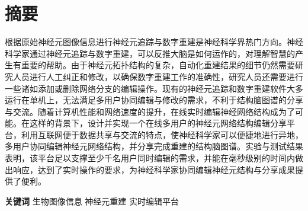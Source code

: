 \chapter{摘要}

根据原始神经元图像信息进行神经元追踪与数字重建是神经科学界热门方向。神经科学家通过神经元追踪与数字重建，可以反推大脑是如何运作的，对理解智慧的产生有重要的帮助。由于神经元拓扑结构的复杂，自动化重建结果的细节仍然需要研究人员进行人工纠正和修改，以确保数字重建工作的准确性，研究人员还需要进行一些诸如添加或删除网络分支的编辑操作。现有的神经元追踪和数字重建软件大多运行在单机上，无法满足多用户协同编辑与修改的需求，不利于结构脑图谱的分享与交流。随着计算机性能和网络速度的提升，在线实时编辑神经网络结构成为了可能。在这样的背景下，设计并实现一个在线多用户的神经元网络结构编辑分享平台，利用互联网便于数据共享与交流的特点，使神经科学家可以便捷地进行异地，多用户协同编辑神经元网络结构，并分享完成重建的结构脑图谱。实验与测试结果表明，该平台足以支撑至少千名用户同时编辑的需求，并能在毫秒级别的时间内做出响应，达到了实时操作的要求，为神经科学家协同编辑神经元结构与分享成果提供了便利。

{
    \vspace{1em}
    \setlength{\parindent}{0em}
    \textbf{关键词} \; 生物图像信息 \; 神经元重建 \; 实时编辑平台 \par
}
